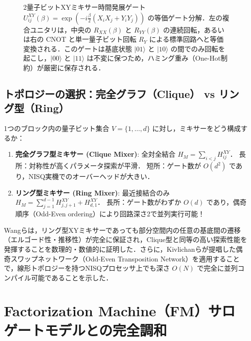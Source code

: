 \documentclass[11pt,a4paper,oneside,openany]{ltjsbook}
\theoremstyle{definition}
\theoremstyle{plain}
\theoremstyle{remark}
\newcommand{\ket}[1]{|#1\rangle}
\begin{document}
\begin{figure}[htbp]
\caption{2量子ビットXYミキサー時間発展ゲート $U_{ij}^{XY}(\beta) = \exp\left(-i \frac{\beta}{2}(X_i X_j + Y_i Y_j)\right)$ の等価ゲート分解．左の複合ユニタリは，中央の $R_{XX}(\beta)$ と $R_{YY}(\beta)$ の連続回転，あるいは右の CNOT と単一量子ビット回転 $R_Y$ による標準回路へと等価変換される．このゲートは基底状態 $\ket{01}$ と $\ket{10}$ の間でのみ回転を起こし，$\ket{00}$ と $\ket{11}$ は不変に保つため，ハミング重み（One-Hot制約）が厳密に保存される．}
\label{fig:xy_mixer_circuit}
\end{figure}

\section{トポロジーの選択：完全グラフ（Clique） vs リング型（Ring）}
1つのブロック内の量子ビット集合 $V = \{1, \dots, d\}$ に対し，ミキサーをどう構成するか：
\begin{enumerate}
    \item \textbf{完全グラフ型ミキサー (Clique Mixer)}:
          全対全結合 $H_M = \sum_{i < j} H_{ij}^{XY}$．
          長所：対称性が高くパラメータ探索が平滑．
          短所：ゲート数が $O(d^2)$ であり，NISQ実機でのオーバーヘッドが大きい．
    \item \textbf{リング型ミキサー (Ring Mixer)}:
          最近接結合のみ $H_M = \sum_{j=1}^{d-1} H_{j, j+1}^{XY} + H_{d, 1}^{XY}$．
          長所：ゲート数がわずか $O(d)$ であり，偶奇順序（Odd-Even ordering）により回路深さ2で並列実行可能！
\end{enumerate}

Wangら\cite{wang2020xy}は，リング型XYミキサーであっても部分空間内の任意の基底間の遷移（エルゴード性・推移性）が完全に保証され，Clique型と同等の高い探索性能を発揮することを数理的・数値的に証明した．さらに，Kivlichanら\cite{kivlichan2018quantum}が提唱した偶奇スワップネットワーク（Odd-Even Transposition Network）を適用することで，線形トポロジーを持つNISQプロセッサ上でも深さ $O(N)$ で完全に並列コンパイル可能であることを示した．

\chapter{Factorization Machine（FM）サロゲートモデルとの完全調和}
\end{document}
